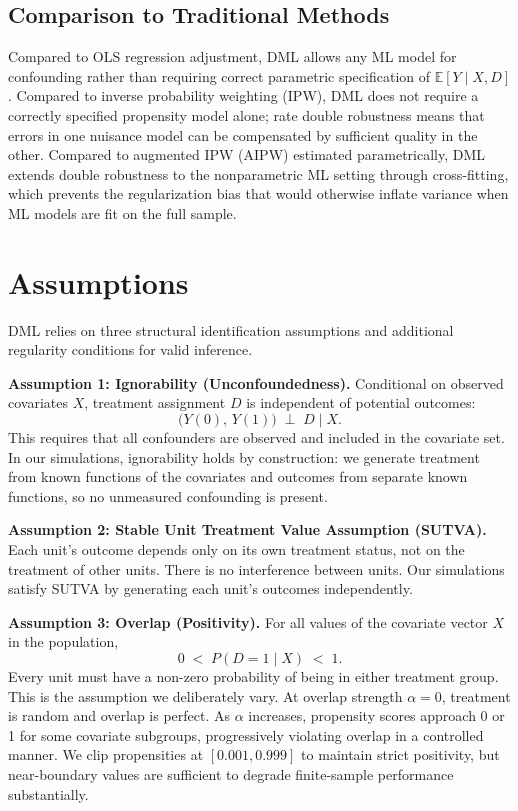 \documentclass[12pt]{article}
\begin{document}
\subsection{Comparison to Traditional Methods}

Compared to OLS regression adjustment, DML allows any ML model for confounding rather than requiring correct parametric specification of $\mathbb{E}[Y \mid X, D]$. Compared to inverse probability weighting (IPW), DML does not require a correctly specified propensity model alone; rate double robustness means that errors in one nuisance model can be compensated by sufficient quality in the other. Compared to augmented IPW (AIPW) estimated parametrically, DML extends double robustness to the nonparametric ML setting through cross-fitting, which prevents the regularization bias that would otherwise inflate variance when ML models are fit on the full sample.

\section{Assumptions}

DML relies on three structural identification assumptions and additional regularity conditions for valid inference.

\medskip
\noindent\textbf{Assumption 1: Ignorability (Unconfoundedness).} Conditional on observed covariates $X$, treatment assignment $D$ is independent of potential outcomes:
\[
  \bigl(Y(0),\, Y(1)\bigr) \;\perp\; D \;\Big|\; X.
\]
This requires that all confounders are observed and included in the covariate set. In our simulations, ignorability holds by construction: we generate treatment from known functions of the covariates and outcomes from separate known functions, so no unmeasured confounding is present.

\medskip
\noindent\textbf{Assumption 2: Stable Unit Treatment Value Assumption (SUTVA).} Each unit's outcome depends only on its own treatment status, not on the treatment of other units. There is no interference between units. Our simulations satisfy SUTVA by generating each unit's outcomes independently.

\medskip
\noindent\textbf{Assumption 3: Overlap (Positivity).} For all values of the covariate vector $X$ in the population,
\[
  0 \;<\; P(D = 1 \mid X) \;<\; 1.
\]
Every unit must have a non-zero probability of being in either treatment group. This is the assumption we deliberately vary. At overlap strength $\alpha = 0$, treatment is random and overlap is perfect. As $\alpha$ increases, propensity scores approach 0 or 1 for some covariate subgroups, progressively violating overlap in a controlled manner. We clip propensities at $[0.001, 0.999]$ to maintain strict positivity, but near-boundary values are sufficient to degrade finite-sample performance substantially.
\end{document}
